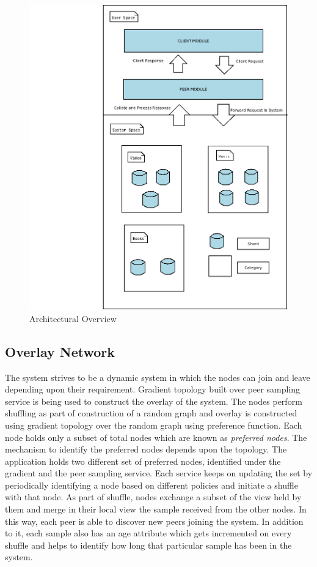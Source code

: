 \documentclass[a4paper,11pt]{kth-mag}
\begin{document}
\begin{figure}[h]
	\includegraphics[scale=0.38]{OverallFunctioning}
	\hspace*{-5cm}  
	\caption{Architectural Overview}
	\label{fig:overall_function}
\end{figure}



\subsection*{Overlay Network}

The system strives to be a dynamic system in which the nodes can join and leave depending upon their requirement. Gradient topology built over peer sampling service is being used to construct the overlay of the system. The nodes perform shuffling as part of construction of a random graph and overlay is constructed using gradient topology over the random graph using preference function. Each node holds only a subset of total nodes which are known as \textit{preferred nodes}. The mechanism to identify the preferred nodes depends upon the topology. The application holds two different set of preferred nodes, identified under the gradient and the peer sampling service. Each service keeps on updating the set by periodically identifying a node based on different policies and initiate a shuffle with that node. As part of shuffle, nodes exchange a subset of the view held by them and merge in their local view the sample received from the other nodes. In this way, each peer is able to discover new peers joining the system. In addition to it, each sample also has an age attribute which gets incremented on every shuffle and helps to identify how long that particular sample has been in the system.
\end{document}

